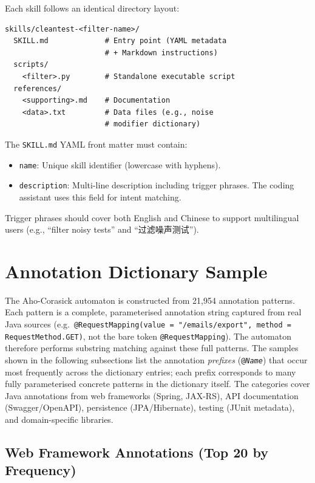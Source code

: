 \documentclass[acmlarge,nonacm,screen]{acmart}
\begin{document}
Each skill follows an identical directory layout:

\begin{lstlisting}[language={},caption={Standard skill directory structure}]
skills/cleantest-<filter-name>/
  SKILL.md             # Entry point (YAML metadata
                       # + Markdown instructions)
  scripts/
    <filter>.py        # Standalone executable script
  references/
    <supporting>.md    # Documentation
    <data>.txt         # Data files (e.g., noise
                       # modifier dictionary)
\end{lstlisting}

The \texttt{SKILL.md} YAML front matter must contain:
\begin{itemize}
    \item \texttt{name}: Unique skill identifier (lowercase with hyphens).
    \item \texttt{description}: Multi-line description including trigger phrases. The coding assistant uses this field for intent matching.
\end{itemize}

Trigger phrases should cover both English and Chinese to support multilingual users (e.g., ``filter noisy tests'' and ``过滤噪声测试'').


\section{Annotation Dictionary Sample}
\label{appendix:dictionary}

The Aho-Corasick automaton is constructed from 21,954 annotation patterns. Each pattern is a complete, parameterised annotation string captured from real Java sources (e.g.\ \texttt{@RequestMapping(value\allowbreak{} =\allowbreak{} "/emails/\allowbreak{}export",\allowbreak{} method\allowbreak{} =\allowbreak{} RequestMethod.GET)}, not the bare token \texttt{@RequestMapping}). The automaton therefore performs substring matching against these full patterns. The samples shown in the following subsections list the annotation \textit{prefixes} (\texttt{@\textit{Name}}) that occur most frequently across the dictionary entries; each prefix corresponds to many fully parameterised concrete patterns in the dictionary itself. The categories cover Java annotations from web frameworks (Spring, JAX-RS), API documentation (Swagger/OpenAPI), persistence (JPA/Hibernate), testing (JUnit metadata), and domain-specific libraries.

\subsection{Web Framework Annotations (Top 20 by Frequency)}
\end{document}
